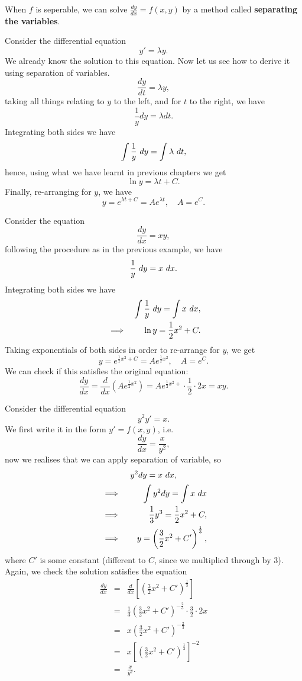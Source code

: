 When $f$ is seperable, we can solve \(\displaystyle\frac{dy}{dx}=f(x,y)\) by a method called \textbf{separating the variables}.

\begin{example}
Consider the differential equation 
\[y'=\lambda y.\]
We already know the solution to this equation. Now let us see how to derive it using separation of variables.
\[\frac{dy}{dt}=\lambda y,\]
taking all things relating to $y$ to the left, and for $t$ to the right, we have
\[\frac{1}{y}dy=\lambda dt.\]
Integrating both sides we have
\[\int \frac{1}{y}\dx[y]=\int\lambda\dx[t],\]
hence, using what we have learnt in previous chapters we get
\[\ln y=\lambda t+C.\]
Finally, re-arranging for $y$, we have
\[y=e^{\lambda t+C}=Ae^{\lambda t},\quad A=e^C.\]
\end{example}

\begin{example}
Consider the equation
\[\frac{dy}{dx}=xy,\]
following the procedure as in the previous example, we have
\[\frac{1}{y}\dx[y]=x\dx.\]
Integrating both sides we have
\begin{eqnarray*}
&&\int\frac{1}{y}\dx[y]=\int x\dx,\\
&\implies& \quad \ln y=\frac{1}{2}x^2 +C.
\end{eqnarray*}
Taking exponentials of both sides in order to re-arrange for $y$, we get
\[y=e^{\frac{1}{2}x^2+C}=Ae^{\frac{1}{2}x^2},\quad A=e^C.\]
We can check if this satisfies the original equation:
\[\frac{dy}{dx}=\frac{d}{dx}\left(Ae^{\frac{1}{2}x^2}\right)=Ae^{\frac{1}{2}x^2+}\cdot\frac{1}{2}\cdot2x=xy.\]
\end{example}

\begin{example}
Consider the differential equation
\[y^2y'=x.\]
We first write it in the form $y'=f(x,y)$, i.e.
\[\frac{dy}{dx}=\frac{x}{y^2},\]
now we realises that we can apply separation of variable, so
\[y^2dy=x\dx,\]
\begin{eqnarray*}
&\implies& \quad \int y^2dy=\int x\dx\\
&\implies& \quad \frac{1}{3}y^3=\frac{1}{2}x^2+C,\\
&\implies& \quad y=\left(\frac{3}{2}x^2+C'\right)^{\frac{1}{3}},
\end{eqnarray*}
where $C'$ is some constant (different to $C$, since we multiplied through by $3$). Again, we check the solution satisfies the equation
\begin{eqnarray*}
\frac{dy}{dx}&=&\frac{d}{dx}\left[\left(\frac{3}{2}x^2+C'\right)^{\frac{1}{3}}\right] \\
&=&\frac{1}{3}\left(\frac{3}{2}x^2+C'\right)^{-\frac{2}{3}}\cdot\frac{3}{2}\cdot2x \\
&=& x\left(\frac{3}{2}x^2+C'\right)^{-\frac{2}{3}} \\
&=& x\left[\left(\frac{3}{2}x^2+C'\right)^{\frac{1}{3}}\right]^{-2} \\
&=&\frac{x}{y^2}.
\end{eqnarray*}
\end{example}

